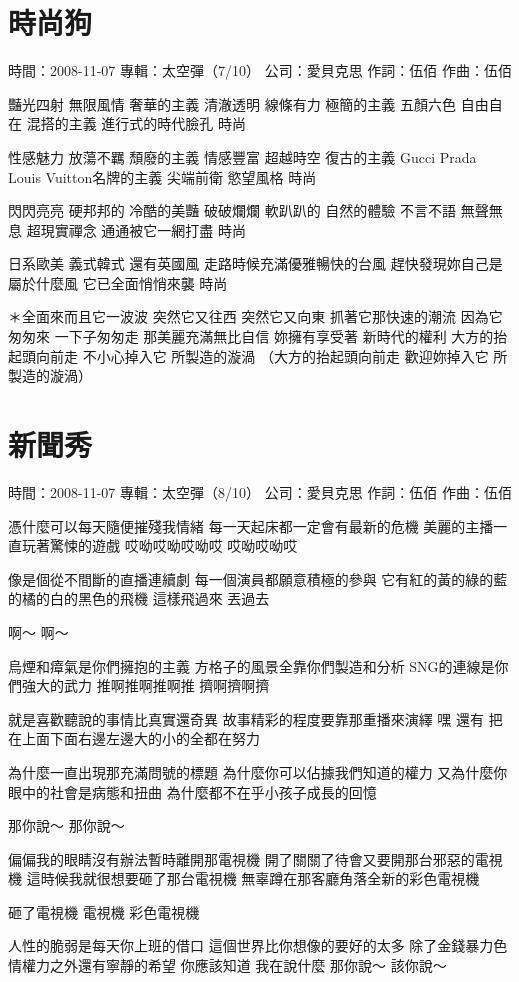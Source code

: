 \documentclass[UTF8,a4paper,oneside,twocolumn,12pt]{ctexbook}
\newcommand{\infopair}[2]{\textbullet #1：#2}
\newcommand{\zc}[1][伍佰]{\infopair{作詞}{#1}}
\newcommand{\zq}[1][伍佰]{\infopair{作曲}{#1}}
\newcommand{\zj}[1]{\infopair{專輯}{#1}}
\newcommand{\sj}[1]{\infopair{時間}{#1}}
\newcommand{\gs}[1]{\infopair{公司}{#1}}
\newenvironment{info}{\begin{flushleft}\kaishu
	}
	{\end{flushleft}\normalsize\yahei\par}
\newenvironment{lyric}{
	}
{}
\begin{document}
\section{時尚狗}
\begin{info}
	\sj{2008-11-07}
	\zj{太空彈（7/10）}
	\gs{愛貝克思}
	\zc
	\zq
\end{info}
\begin{lyric}
	豔光四射 無限風情 奢華的主義
	清澈透明 線條有力 極簡的主義
	五顏六色 自由自在 混搭的主義
	進行式的時代臉孔 時尚

	性感魅力 放蕩不羈 頹廢的主義
	情感豐富 超越時空 復古的主義
	Gucci Prada Louis Vuitton名牌的主義
	尖端前衛 慾望風格 時尚

	閃閃亮亮 硬邦邦的 冷酷的美豔
	破破爛爛 軟趴趴的 自然的體驗
	不言不語 無聲無息 超現實禪念
	通通被它一網打盡 時尚

	日系歐美 義式韓式 還有英國風
	走路時候充滿優雅暢快的台風
	趕快發現妳自己是屬於什麼風
	它已全面悄悄來襲 時尚

	＊全面來而且它一波波 突然它又往西 突然它又向東
	抓著它那快速的潮流 因為它匆匆來 一下子匆匆走
	那美麗充滿無比自信 妳擁有享受著 新時代的權利
	大方的抬起頭向前走 不小心掉入它 所製造的漩渦
	（大方的抬起頭向前走 歡迎妳掉入它 所製造的漩渦）
\end{lyric}

\section{新聞秀}
\begin{info}
	\sj{2008-11-07}
	\zj{太空彈（8/10）}
	\gs{愛貝克思}
	\zc
	\zq
\end{info}
\begin{lyric}
	憑什麼可以每天隨便摧殘我情緒
	每一天起床都一定會有最新的危機
	美麗的主播一直玩著驚悚的遊戲
	哎呦哎呦哎呦哎 哎呦哎呦哎

	像是個從不間斷的直播連續劇
	每一個演員都願意積極的參與
	它有紅的黃的綠的藍的橘的白的黑色的飛機
	這樣飛過來 丟過去

	啊～
	啊～

	烏煙和瘴氣是你們擁抱的主義
	方格子的風景全靠你們製造和分析
	SNG的連線是你們強大的武力
	推啊推啊推啊推 擠啊擠啊擠

	就是喜歡聽說的事情比真實還奇異
	故事精彩的程度要靠那重播來演繹
	嘿 還有
	把在上面下面右邊左邊大的小的全都在努力

	為什麼一直出現那充滿問號的標題
	為什麼你可以佔據我們知道的權力
	又為什麼你眼中的社會是病態和扭曲
	為什麼都不在乎小孩子成長的回憶

	那你說～ 那你說～

	偏偏我的眼睛沒有辦法暫時離開那電視機
	開了關關了待會又要開那台邪惡的電視機
	這時候我就很想要砸了那台電視機
	無辜蹲在那客廳角落全新的彩色電視機

	砸了電視機 電視機 彩色電視機

	人性的脆弱是每天你上班的借口
	這個世界比你想像的要好的太多
	除了金錢暴力色情權力之外還有寧靜的希望
	你應該知道 我在說什麼
	那你說～ 該你說～
\end{lyric}
\end{document}

